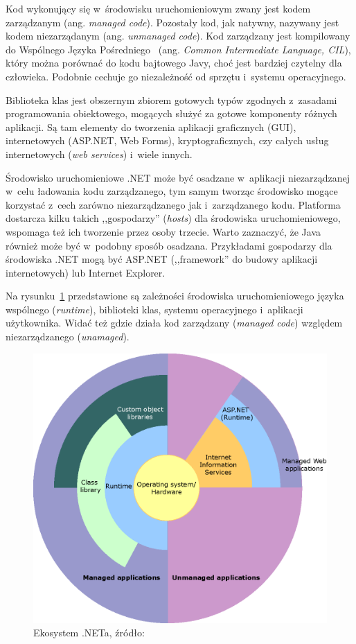 Kod wykonujący się w~środowisku uruchomieniowym zwany jest kodem zarządzanym (ang. \emph{managed code}). Pozostały kod, jak natywny, nazywany jest kodem niezarządanym (ang. \emph{unmanaged code}). Kod zarządzany jest kompilowany do Wspólnego Języka Pośredniego~\cite{cil} (ang. \emph{Common Intermediate Language, CIL}), który można porównać do kodu bajtowego Javy, choć jest bardziej czytelny dla człowieka. Podobnie cechuje go niezależność od sprzętu i~systemu operacyjnego.

Biblioteka klas jest obszernym zbiorem gotowych typów zgodnych z~zasadami programowania obiektowego, mogących służyć za gotowe komponenty różnych aplikacji. Są tam elementy do tworzenia aplikacji graficznych (GUI), internetowych (ASP.NET, Web Forms), kryptograficznych, czy całych usług internetowych (\emph{web services}) i~wiele innych.

Środowisko uruchomieniowe .NET może być osadzane w~aplikacji niezarządzanej w~celu ładowania kodu zarządzanego, tym samym tworząc środowisko mogące korzystać z~cech zarówno niezarządzanego jak i~zarządzanego kodu. Platforma dostarcza kilku takich ,,gospodarzy'' (\emph{hosts}) dla środowiska uruchomieniowego, wspomaga też ich tworzenie przez osoby trzecie.
Warto zaznaczyć, że Java również może być w~podobny sposób osadzana.
Przykładami gospodarzy dla środowiska .NET mogą być ASP.NET (,,framework'' do budowy aplikacji internetowych) lub Internet Explorer.

Na rysunku~\ref{fig:dotnet-ecosystem} przedstawione są zależności środowiska uruchomieniowego języka wspólnego (\emph{runtime}), biblioteki klas, systemu operacyjnego i~aplikacji użytkownika. Widać też gdzie działa kod zarządzany (\emph{managed code}) względem niezarządzanego (\emph{unamaged}).

\begin{figure}
	\centering
		\includegraphics[scale=0.6]{img/dotnet-ecosystem.png}
	\caption{Ekosystem .NETa, źródło:~\cite{dot-net-overview}}
	\label{fig:dotnet-ecosystem}
\end{figure}

